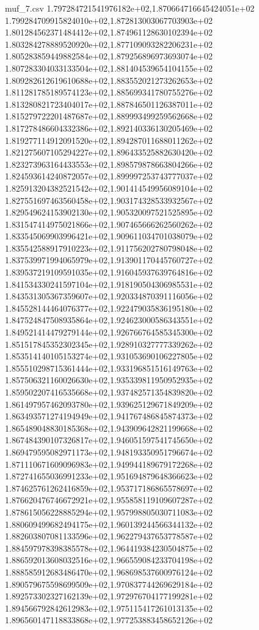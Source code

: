 \begin{filecontents*}{muf_7.csv}
1.797284721541976182e+02,1.870664716645424051e+02
1.799284709915824010e+02,1.872813003067703903e+02
1.801284562371484412e+02,1.874961128630102394e+02
1.803284278889520920e+02,1.877109093282206231e+02
1.805283859449882584e+02,1.879256896973693074e+02
1.807283304033133504e+02,1.881404539654104155e+02
1.809282612619610688e+02,1.883552021273262653e+02
1.811281785189574123e+02,1.885699341780755276e+02
1.813280821723404017e+02,1.887846501126387011e+02
1.815279722201487687e+02,1.889993499259562668e+02
1.817278486604332386e+02,1.892140336130205469e+02
1.819277114912091520e+02,1.894287011688011262e+02
1.821275607105294227e+02,1.896433525882630420e+02
1.823273963164433553e+02,1.898579878663804266e+02
1.824593614240872057e+02,1.899997253743777037e+02
1.825913204382521542e+02,1.901414549956089104e+02
1.827551697463560458e+02,1.903174328533932567e+02
1.829549624153902130e+02,1.905320097521525895e+02
1.831547414975021866e+02,1.907465666262560262e+02
1.833545069903996421e+02,1.909611034701038079e+02
1.835542588917910223e+02,1.911756202780798048e+02
1.837539971994065979e+02,1.913901170445760727e+02
1.839537219109591035e+02,1.916045937639764816e+02
1.841534330241597104e+02,1.918190504306985531e+02
1.843531305367359607e+02,1.920334870391116056e+02
1.845528144464076377e+02,1.922479035836195180e+02
1.847524847508935864e+02,1.924623000586343551e+02
1.849521414479279144e+02,1.926766764585345300e+02
1.851517845352302345e+02,1.928910327777339262e+02
1.853514140105153274e+02,1.931053690106227805e+02
1.855510298715361444e+02,1.933196851516149763e+02
1.857506321160026630e+02,1.935339811950952935e+02
1.859502207416535668e+02,1.937482571354839820e+02
1.861497957462093780e+02,1.939625129671849209e+02
1.863493571274194949e+02,1.941767486845874373e+02
1.865489048830185368e+02,1.943909642821199668e+02
1.867484390107326817e+02,1.946051597541745650e+02
1.869479595082971173e+02,1.948193350951796674e+02
1.871110671609096983e+02,1.949944189679172268e+02
1.872741655036991233e+02,1.951694879648366623e+02
1.874625761262416859e+02,1.953717186865578697e+02
1.876620476746672921e+02,1.955858119109607287e+02
1.878615056228885294e+02,1.957998805030711083e+02
1.880609499682494175e+02,1.960139244566344132e+02
1.882603807081133596e+02,1.962279437653778587e+02
1.884597978398385578e+02,1.964419384230504875e+02
1.886592013608032516e+02,1.966559084233704198e+02
1.888585912683486470e+02,1.968698537600976124e+02
1.890579675598699509e+02,1.970837744269629184e+02
1.892573302327162139e+02,1.972976704177199281e+02
1.894566792842612983e+02,1.975115417261013135e+02
1.896560147118833868e+02,1.977253883458652126e+02

\end{filecontents*}
